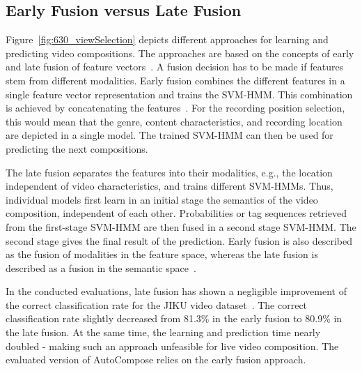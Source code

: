 \subsection{Early Fusion versus Late Fusion}
Figure~\ref{fig:630_viewSelection} depicts different approaches for learning and predicting video compositions.
The approaches are based on the concepts of early and late fusion of feature vectors~\cite{Snoek2005}.
A fusion decision has to be made if features stem from different modalities.
Early fusion combines the different features in a single feature vector representation and trains the \ac{SVM-HMM}.
This combination is achieved by concatenating the features~\cite{Snoek2004}.
For the recording position selection, this would mean that the genre, content characteristics, and recording location are depicted in a single model.
The trained \ac{SVM-HMM} can then be used for predicting the next compositions.

The late fusion separates the features into their modalities, e.g., the location independent of video characteristics, and trains different \ac{SVM-HMM}s. 
Thus, individual models first learn in an initial stage the semantics of the video composition, independent of each other.
Probabilities or tag sequences retrieved from the first-stage \ac{SVM-HMM} are then fused in a second stage \ac{SVM-HMM}.
The second stage gives the final result of the prediction.
Early fusion is also described as the fusion of  modalities in the feature space, whereas the late fusion is described as a fusion in the semantic space~\cite{Snoek2005}.

In the conducted evaluations, late fusion has shown a negligible improvement of the correct classification rate for the JIKU video dataset~\cite{Saini2013}.
The correct classification rate slightly decreased from 81.3\% in the early fusion to 80.9\% in the late fusion. 
At the same time, the learning and prediction time nearly doubled - making such an approach unfeasible for live video composition.
The evaluated version of AutoCompose relies on the early fusion approach.